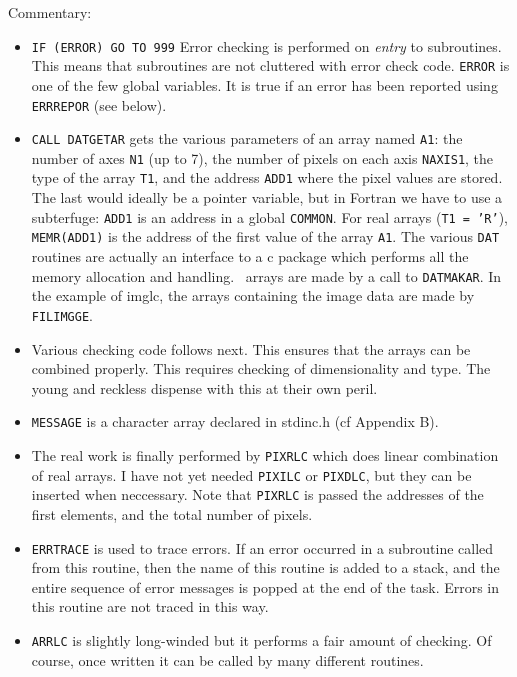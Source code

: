 Commentary:
\begin{itemize}
\item {\tt IF (ERROR) GO TO 999} Error checking is performed on {\em entry}
to subroutines. This means that subroutines are not cluttered with
error check code. {\tt ERROR} is one of the few global variables.
It is true if an error has been reported using {\tt ERRREPOR} (see below).
\item {\tt CALL DATGETAR} gets the various parameters of an array named
{\tt A1}: the number of axes {\tt N1} (up to 7), 
the number of pixels on each axis {\tt NAXIS1}, the type of the array {\tt T1},
and the address {\tt ADD1} where the pixel values are stored. The last would
ideally be a pointer variable, but in Fortran we have to use a subterfuge:
{\tt ADD1} is an address in a global {\tt COMMON}. For real arrays ({\tt T1
= 'R'}), {\tt MEMR(ADD1)} is the address of the first value of the array
{\tt A1}. The various {\tt DAT} routines are actually an interface to a
c package which performs all the memory allocation and handling. \sde\ arrays
are made by a call to {\tt DATMAKAR}. In the example of imglc, the arrays
containing the image data are made by {\tt FILIMGGE}.
\item Various checking code follows next. This ensures that the arrays
can be combined properly. This requires checking of dimensionality and
type. The young and reckless dispense with this at their own peril.
\item {\tt MESSAGE} is a character array declared in stdinc.h (cf Appendix B).
\item The real work is finally performed by {\tt PIXRLC} which does
linear combination of real arrays. I have not yet needed {\tt PIXILC}
or {\tt PIXDLC}, but they can be inserted when neccessary. Note that
{\tt PIXRLC} is passed the addresses of the first elements, and the total
number of pixels.
\item {\tt ERRTRACE} is used to trace errors. If an error occurred in a
subroutine called from this routine, then the name of this routine is added
to a stack, and the entire sequence of error messages is popped at the
end of the task. Errors in this routine are not traced in this way.
\item {\tt ARRLC} is slightly long-winded but it performs a fair amount
of checking. Of course, once written it can be called by many different
routines.
\end{itemize}

